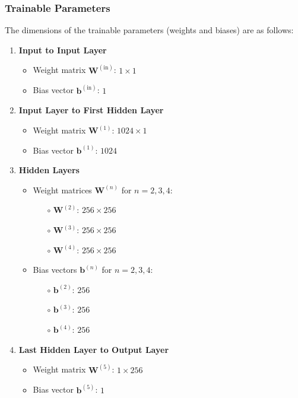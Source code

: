 \documentclass{ioereport}
\begin{document}
\subsubsection*{Trainable Parameters}
The dimensions of the trainable parameters (weights and biases) are as follows:

\begin{enumerate}[label=\textbf{\roman*.}]
    \item \textbf{Input to Input Layer}
    \begin{itemize}
        \item Weight matrix \( \mathbf{W}^{(\text{in})} \): \( 1 \times 1 \)
        \item Bias vector \( \mathbf{b}^{(\text{in})} \): \( 1 \)
    \end{itemize}
    \item \textbf{Input Layer to First Hidden Layer}
    \begin{itemize}
        \item Weight matrix \( \mathbf{W}^{(\text{1})} \): \( 1024 \times 1 \)
        \item Bias vector \( \mathbf{b}^{(\text{1})} \): \( 1024 \)
    \end{itemize}
    \item \textbf{Hidden Layers}
    \begin{itemize}
        \item Weight matrices \( \mathbf{W}^{(n)} \) for \( n = 2, 3, 4 \):
        \begin{itemize}
            \item[\(\circ\)] \( \mathbf{W}^{(2)} \): \( 256 \times 256 \)
            \item[\(\circ\)] \( \mathbf{W}^{(3)} \): \( 256 \times 256 \)
            \item[\(\circ\)] \( \mathbf{W}^{(4)} \): \( 256 \times 256 \)
        \end{itemize}
        \item Bias vectors \( \mathbf{b}^{(n)} \) for \( n = 2, 3, 4 \):
        \begin{itemize}
            \item[\(\circ\)] \( \mathbf{b}^{(2)} \): \( 256 \)
            \item[\(\circ\)] \( \mathbf{b}^{(3)} \): \( 256 \)
            \item[\(\circ\)] \( \mathbf{b}^{(4)} \): \( 256 \)
        \end{itemize}
    \end{itemize}
    \item \textbf{Last Hidden Layer to Output Layer}
    \begin{itemize}
        \item Weight matrix \( \mathbf{W}^{(\text{5})} \): \( 1 \times 256 \)
        \item Bias vector \( \mathbf{b}^{(\text{5})} \): \( 1 \)
    \end{itemize}
\end{enumerate}
\end{document}
